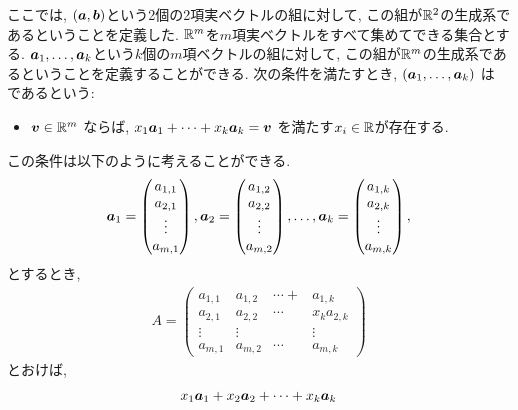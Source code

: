 \begin{remark}
  ここでは, $(\boldsymbol{a},\boldsymbol{b})$という2個の2項実ベクトルの組に対して,
  この組が$\mathbb{R}^2$の生成系であるということを定義した.
  $\mathbb{R}^m$を$m$項実ベクトルをすべて集めてできる集合とする.
  $\boldsymbol{a}_1,\ldots, \boldsymbol{a}_k$という$k$個の$m$項ベクトルの組に対して,
  この組が$\mathbb{R}^m$の生成系であるということを定義することができる.
  次の条件を満たすとき,
  $(\boldsymbol{a}_1,\ldots, \boldsymbol{a}_k)$
  は
  であるという:
  \begin{itemize}
    \item
      $\boldsymbol{v}\in\mathbb{R}^m$
      ならば, 
      $x_1\boldsymbol{a}_1+\cdots+x_k\boldsymbol{a}_k=\boldsymbol{v}$
      を満たす$x_i\in\mathbb{R}$が存在する.
  \end{itemize}
  この条件は以下のように考えることができる.
  \begin{align*}
    \boldsymbol{a}_1=\begin{pmatrix}a_{1,1}\\a_{2,1}\\\vdots\\a_{m,1}\end{pmatrix},
    \boldsymbol{a}_2=\begin{pmatrix}a_{1,2}\\a_{2,2}\\\vdots\\a_{m,2}\end{pmatrix},
    \ldots,
    \boldsymbol{a}_k=\begin{pmatrix}a_{1,k}\\a_{2,k}\\\vdots\\a_{m,k}\end{pmatrix},
  \end{align*}
  とするとき,
  \begin{align*}
    A
    =\begin{pmatrix}a_{1,1}&a_{1,2}&\cdots+&a_{1,k}\\a_{2,1}&a_{2,2}&\cdots&x_ka_{2,k}\\\vdots&\vdots&&\vdots\\a_{m,1}&a_{m,2}&\cdots&a_{m,k}\end{pmatrix}
  \end{align*}
  とおけば,
  \begin{align*}
    x_1\aaa_1+x_2\aaa_2+\cdots+x_k\aaa_k

\end{align*}
\end{remark}
